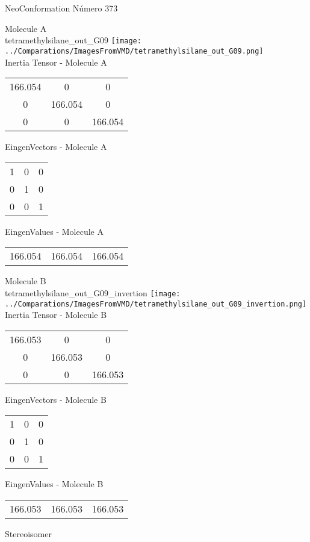 \vtab[-2cm]
\begin{center}
{\large NeoConformation \tab Número 373}
\end{center}
\begin{multicols}{2}
\begin{center}

Molecule A \\ 
tetramethylsilane\_out\_G09
\texttt{[image: ../Comparations/ImagesFromVMD/tetramethylsilane\_out\_G09.png]}
\\
Inertia Tensor - Molecule A \\
\vtab

\begin{tabular}{|c c c|}
166.054	 & 	0	 & 	0	 \\
0	 & 	166.054	 & 	0	 \\
0	 & 	0	 & 	166.054
\end{tabular}

\vtab
 EingenVectors - Molecule A     \\
\vtab
\begin{tabular}{|c c c|}
1	 & 	0	 & 	0	 \\
0	 & 	1	 & 	0	 \\
0	 & 	0	 & 	1
\end{tabular}

\vtab
 EingenValues - Molecule A     \\
\vtab
\begin{tabular}{|c c c|}
166.054	 & 	166.054	 & 	166.054	 \\
\end{tabular}
\columnbreak

Molecule B \\ 
tetramethylsilane\_out\_G09\_invertion
\texttt{[image: ../Comparations/ImagesFromVMD/tetramethylsilane\_out\_G09\_invertion.png]}
\\
Inertia Tensor - Molecule B \\
\vtab

\begin{tabular}{|c c c|}
166.053	 & 	0	 & 	0	 \\
0	 & 	166.053	 & 	0	 \\
0	 & 	0	 & 	166.053
\end{tabular}

\vtab
 EingenVectors - Molecule B     \\
\vtab
\begin{tabular}{|c c c|}
1	 & 	0	 & 	0	 \\
0	 & 	1	 & 	0	 \\
0	 & 	0	 & 	1
\end{tabular}

\vtab
 EingenValues - Molecule B     \\
\vtab
\begin{tabular}{|c c c|}
166.053	 & 	166.053	 & 	166.053	 \\
\end{tabular}

\end{center}
\end{multicols}
\begin{center}
\vtab
\vtab
\textcolor{NavyBlue}{\Large Stereoisomer}
\end{center}

